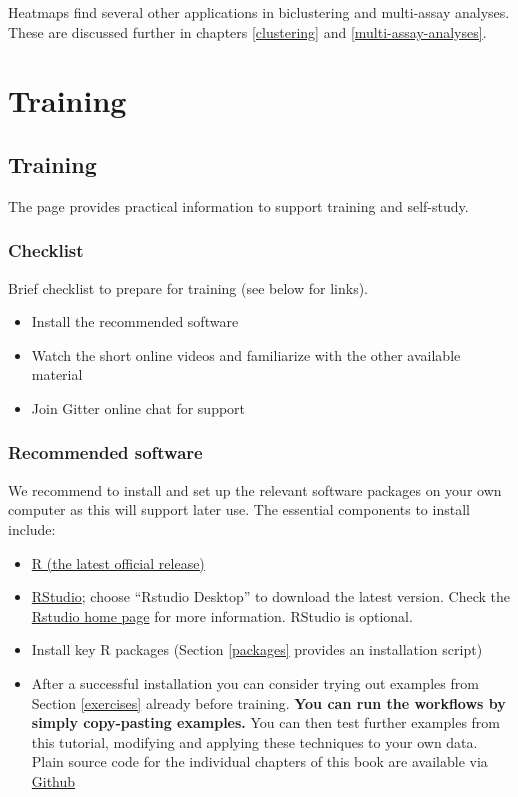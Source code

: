 \documentclass[
]{book}
\providecommand{\tightlist}{%
  \setlength{\itemsep}{0pt}\setlength{\parskip}{0pt}}
\begin{document}
Heatmaps find several other applications in biclustering and
multi-assay analyses. These are discussed further in chapters
\ref{clustering} and \ref{multi-assay-analyses}.

\hypertarget{part-training}{%
\part{Training}\label{part-training}}

\hypertarget{training}{%
\chapter{Training}\label{training}}

The page provides practical information to support training and self-study.

\hypertarget{checklist}{%
\section{Checklist}\label{checklist}}

Brief checklist to prepare for training (see below for links).

\begin{itemize}
\tightlist
\item
  Install the recommended software
\item
  Watch the short online videos and familiarize with the other available material
\item
  Join Gitter online chat for support
\end{itemize}

\hypertarget{software}{%
\section{Recommended software}\label{software}}

We recommend to install and set up the relevant software packages on
your own computer as this will support later use. The essential
components to install include:

\begin{itemize}
\item
  \href{https://www.r-project.org/}{R (the latest official release)}
\item
  \href{https://www.rstudio.com/products/rstudio/download/}{RStudio};
  choose ``Rstudio Desktop'' to download the latest version. Check the
  \href{https://www.rstudio.com/}{Rstudio home page} for more
  information. RStudio is optional.
\item
  Install key R packages (Section \ref{packages} provides an installation script)
\item
  After a successful installation you can consider trying out examples
  from Section \ref{exercises} already before training. \textbf{You can run
  the workflows by simply copy-pasting examples.} You can then test
  further examples from this tutorial, modifying and applying these
  techniques to your own data. Plain source code for the individual chapters of this book are available via \href{https://github.com/microbiome/OMA/tree/master/R}{Github}
\end{itemize}
\end{document}
